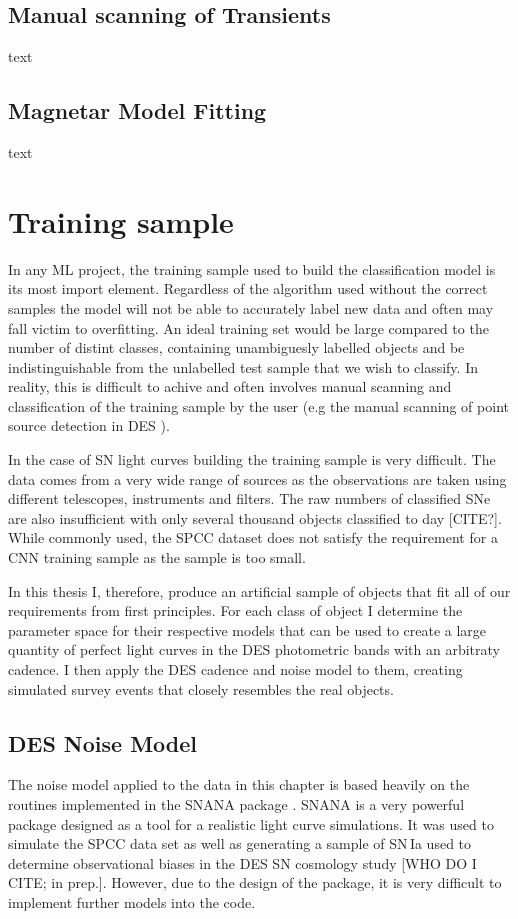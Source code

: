\subsection{Manual scanning of Transients}
text
\subsection{Magnetar Model Fitting}
text

\section{Training sample}
In any ML project, the training sample used to build the classification model is its most import element. Regardless of the algorithm used without the correct samples the model will not be able to accurately label new data and often may fall victim to overfitting. An ideal training set would be large compared to the number of distint classes, containing unambiguesly labelled objects and be indistinguishable from the unlabelled test sample that we wish to classify. In reality, this is difficult to achive and often involves manual scanning and classification of the training sample by the user (e.g the manual scanning of point source detection in DES \citep[][and similar studies]{Goldstein2015}).

In the case of SN light curves building the training sample is very difficult. The data comes from a very wide range of sources as the observations are taken using different telescopes, instruments and filters. The raw numbers of classified SNe are also insufficient with only several thousand objects classified to day [CITE?]. While commonly used, the SPCC dataset does not satisfy the requirement for a CNN training sample as the sample is too small.

In this thesis I, therefore, produce an artificial sample of objects that fit all of our requirements from first principles. For each class of object I determine the parameter space for their respective models that can be used to create a large quantity of perfect light curves in the DES photometric bands with an arbitraty cadence. I then apply the DES cadence and noise model to them, creating simulated survey events that closely resembles the real objects.

\subsection{DES Noise Model} \label{sec:NoiseModel}
The noise model applied to the data in this chapter is based heavily on the routines implemented in the SNANA package \citep{Kessler2009}. SNANA is a very powerful package designed as a tool for a realistic light curve simulations. It was used to simulate the SPCC data set \citep{Kessler2010} as well as generating a sample of SN\,Ia used to determine observational biases in the DES SN cosmology study [WHO DO I CITE; in prep.]. However, due to the design of the package, it is very difficult to implement further models into the code.

